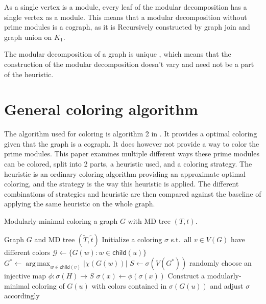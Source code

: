 \documentclass{amsart}
\newcommand{\child}{\mathsf{child}}
\DeclareMathOperator*{\argmax}{arg\,max}
\newcommand{\T}{\widetilde{T}}
\renewcommand{\t}{\widetilde{t}}
\begin{document}
As a single vertex is a module, every leaf of the modular decomposition has
a single vertex as a module. This means that a modular decomposition without
prime modules is a cograph, as it is Recursively constructed by graph join and
graph union on $K_1$.

The modular decomposition of a graph is unique \cite{MDUnique}, which means that the
construction of the modular decomposition doesn't vary and need not be a part of
the heuristic.


\section{General coloring algorithm}

The algorithm used for coloring is algorithm 2 in \cite{HCL}. It provides a
optimal coloring given that the graph is a cograph. It does however not
provide a way to color the prime modules. This paper examines multiple different
ways these prime modules can be colored, split into 2 parts, a heuristic used,
and a coloring strategy. The heuristic is an ordinary coloring algorithm
providing an approximate optimal coloring, and the strategy is the way this
heuristic is applied. The different combinations of strategies and heuristic are
then compared against the baseline of applying the same heuristic on the whole
graph.

\begin{algorithm}[H]
  \caption{Modularly-minimal coloring a graph $G$ with MD tree $(T,t)$.}
  \label{alg:generic}
  \begin{algorithmic}[1]
    \REQUIRE Graph $G$ and MD tree $(\T,\t)$
    \STATE Initialize a coloring $\sigma$ s.t.\ all $v \in V(G)$
           have different colors
          \STATE $\mathcal{G} \leftarrow \{G(w)\colon w\in\child(u)\}$ 
          \STATE $G^* \leftarrow \argmax_{w\in\child(v)} |\chi(G(w))|$
          \STATE $S \leftarrow \sigma(V(G^*))$ 
             \STATE randomly choose an injective map $\phi:\sigma(H)\to S$
                \STATE $\sigma(x)\leftarrow \phi(\sigma(x))$  
             \ENDFOR
          \ENDFOR
          \STATE Construct a modularly-minimal coloring of $G(u)$
              with colors contained in $\sigma(G(u))$
              and adjust $\sigma$ accordingly 
       \ENDIF
    \ENDFOR
  \end{algorithmic}
\end{algorithm}
\end{document}
